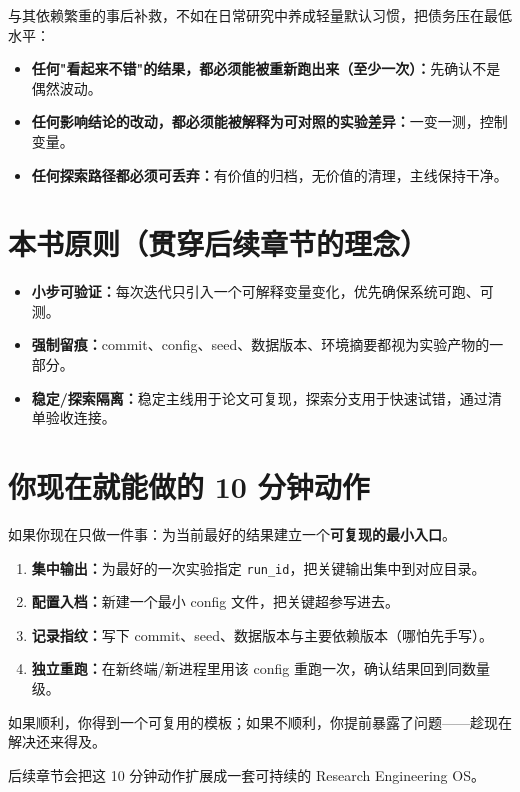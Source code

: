 与其依赖繁重的事后补救，不如在日常研究中养成轻量默认习惯，把债务压在最低水平：
\begin{itemize}
  \item \textbf{任何"看起来不错"的结果，都必须能被重新跑出来（至少一次）：}先确认不是偶然波动。
  \item \textbf{任何影响结论的改动，都必须能被解释为可对照的实验差异：}一变一测，控制变量。
  \item \textbf{任何探索路径都必须可丢弃：}有价值的归档，无价值的清理，主线保持干净。
\end{itemize}

\section{本书原则（贯穿后续章节的理念）}
\begin{itemize}
  \item \textbf{小步可验证：}每次迭代只引入一个可解释变量变化，优先确保系统可跑、可测。
  \item \textbf{强制留痕：}commit、config、seed、数据版本、环境摘要都视为实验产物的一部分。
  \item \textbf{稳定/探索隔离：}稳定主线用于论文可复现，探索分支用于快速试错，通过清单验收连接。
\end{itemize}

\section{你现在就能做的 10 分钟动作}
如果你现在只做一件事：为当前最好的结果建立一个\textbf{可复现的最小入口}。
\begin{enumerate}
  \item \textbf{集中输出：}为最好的一次实验指定 \texttt{run\_id}，把关键输出集中到对应目录。
  \item \textbf{配置入档：}新建一个最小 config 文件，把关键超参写进去。
  \item \textbf{记录指纹：}写下 commit、seed、数据版本与主要依赖版本（哪怕先手写）。
  \item \textbf{独立重跑：}在新终端/新进程里用该 config 重跑一次，确认结果回到同数量级。
\end{enumerate}

如果顺利，你得到一个可复用的模板；如果不顺利，你提前暴露了问题——趁现在解决还来得及。

后续章节会把这 10 分钟动作扩展成一套可持续的 Research Engineering OS。
